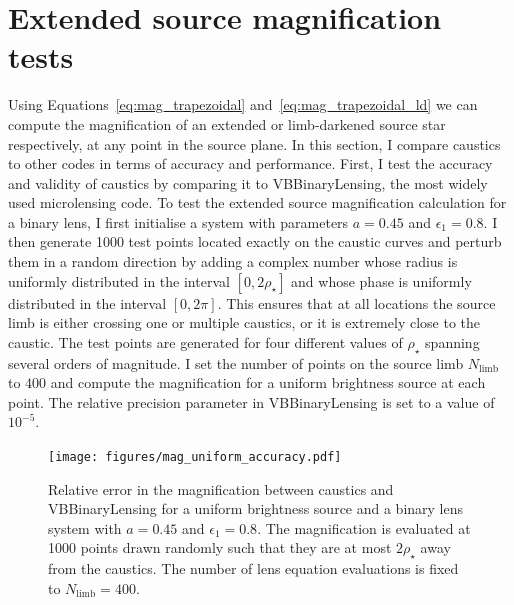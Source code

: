 \documentclass[12pt,dvipsnames]{report}
\newcommand{\ssf}[1]{\textsf{#1}}
\begin{document}
\section{Extended source magnification tests}
Using Equations~\ref{eq:mag_trapezoidal} and~\ref{eq:mag_trapezoidal_ld} we can compute the 
magnification of an extended or limb-darkened source star respectively, at any point in the 
source plane. In this section, I compare \ssf{caustics} to other codes in terms of accuracy
and performance. First, I test the accuracy and validity of \ssf{caustics} by comparing it 
to \ssf{VBBinaryLensing}, the most widely used microlensing code. To test the extended 
source magnification calculation for a binary lens,  I first initialise a system with parameters 
$a=0.45$ and $\epsilon_1=0.8$.  I then generate 1000 test points located exactly on the caustic 
curves and perturb them in a random direction by adding a complex number whose radius 
is uniformly distributed in the interval $[0, 2\rho_\star]$ 
and whose phase is uniformly distributed in the interval $[0, 2\pi]$. This ensures that at all 
locations the source limb is either crossing one or multiple caustics, or it is extremely 
close to the caustic. 
The test points are generated for four different values of $\rho_\star$ spanning several 
orders of magnitude. I set the number of points on the source limb  $N_\mathrm{limb}$ to 
$400$ and compute the magnification for a uniform brightness source at each point. The 
relative precision parameter in \ssf{VBBinaryLensing} is set to a value of $10^{-5}$. 

\begin{figure}[t]
    \begin{centering}
        \texttt{[image: figures/mag\_uniform\_accuracy.pdf]}
        \caption{Relative error in the magnification between \ssf{caustics} and 
        \ssf{VBBinaryLensing} for a uniform brightness source and a binary 
        lens system with $a=0.45$ and $\epsilon_1=0.8$. The magnification is evaluated at 
        1000 points drawn randomly such that they are at most $2\rho_\star$ away from the
        caustics. The number of lens equation evaluations is fixed to $N_\mathrm{limb}=400$.}
            \label{fig:mag_uniform_accuracy}
    \end{centering}
\end{figure}
\end{document}
